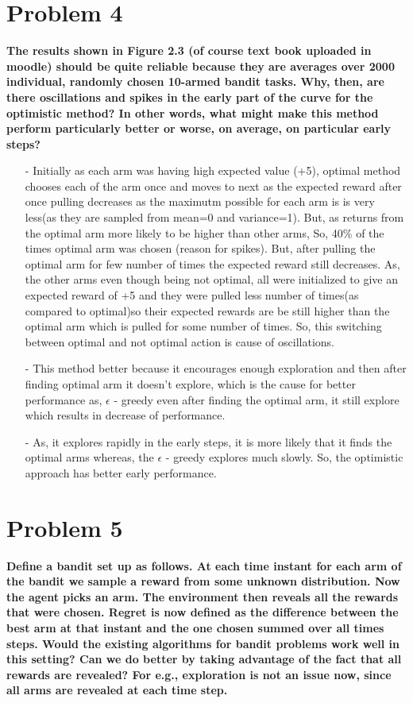 \documentclass [11pt]{article}
\numberwithin{equation}{section}
\begin{document}
\section*{Problem 4}
\textbf{The results shown in Figure 2.3 (of course text book uploaded in moodle) should be quite reliable because they are averages over 2000 individual, randomly chosen 10-armed bandit tasks. Why, then, are there oscillations and spikes in the early part of the curve for the optimistic method? In other words, what might make this method perform particularly better or worse, on average, on particular early steps?}
\begin{itemize}
    \item[-] Initially as each arm was having high expected value (+5), optimal method  chooses each of the arm once and moves to next as the expected reward after once pulling decreases as the maximutm possible for each arm is is very less(as they are sampled from mean=0 and variance=1). But, as returns from the optimal arm more likely to be higher than other arms, So, 40\% of the times optimal arm was chosen (reason for spikes). But, after pulling the optimal arm for few number of times the expected reward still decreases. As, the other arms even though being not optimal, all were initialized to give an expected reward of +5 and they were pulled less number of times(as compared to optimal)so their expected rewards are be still higher than the optimal arm which is pulled for some number of times. So, this switching between optimal and not optimal action is cause of oscillations.
    
    \item[-] This method better because it encourages enough exploration and then after finding optimal arm it doesn't explore, which is the cause for better performance as, $\epsilon$ - greedy even after finding the optimal arm, it still explore which results in decrease of performance.
    
    \item[-] As, it explores rapidly in the early steps, it is more likely that it finds the optimal arms whereas, the $\epsilon$ - greedy explores much slowly.
    So, the optimistic approach has better early performance.
\end{itemize}

\vspace{0.5cm}

\section*{Problem 5}
\textbf{Define a bandit set up as follows. At each time instant for each arm of the bandit we sample a reward from some unknown distribution. Now the agent picks an arm. The environment then reveals all the rewards that were chosen. Regret is now defined as the difference between the best arm at that instant and the one chosen summed over all times steps. Would the existing algorithms for bandit problems work well in this
setting? Can we do better by taking advantage of the fact that all rewards are revealed? For e.g., exploration is not an issue now, since all arms are revealed at each time step.}
\end{document}
